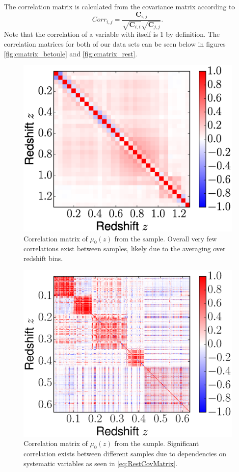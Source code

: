 \documentclass[12pt,a4paper]{article}
\begin{document}
The correlation matrix is calculated from the covariance matrix according to
%
\begin{equation}
  \label{eq:correlation}
  Corr_{i,j} = \frac{\mathbf{C}_{i,j}}{\sqrt{\mathbf{C}_{i,i}}\sqrt{\mathbf{C}_{j,j}}}.
\end{equation}
%
Note that the correlation of a variable with itself is 1 by definition.
The correlation matrices for both of our data sets can be seen below in
figures \autoref{fig:cmatrix_betoule} and \autoref{fig:cmatrix_rest}.
%
\begin{figure}
  \includegraphics[width=0.8\linewidth]{figures/Betoule_correlation.eps}
  \caption{Correlation matrix of $\mu_0(z)$ from the
    \citet{betoule2014} sample. Overall very few correlations exist between
    samples, likely due to the averaging over redshift bins.}
  \label{fig:cmatrix_betoule}
\end{figure}
%
\begin{figure}
  \includegraphics[width=0.8\linewidth]{figures/Rest_correlation.eps}
  \caption{Correlation matrix of $\mu_0(z)$ from the
    \citet{rest2014} sample. Significant correlation exists between
    different samples due to dependencies on systematic variables
    as seen in \autoref{eq:RestCovMatrix}.}
  \label{fig:cmatrix_rest}
\end{figure}
\end{document}

